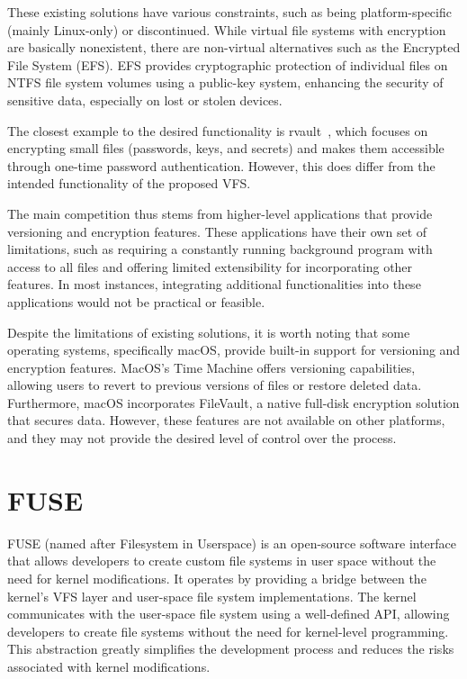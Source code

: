 These existing solutions have various constraints, such as being platform-specific (mainly Linux-only) or discontinued.
While virtual file systems with encryption are basically nonexistent, there are non-virtual alternatives such as the Encrypted File System (EFS).
EFS provides cryptographic protection of individual files on NTFS file system volumes using a public-key system, enhancing the security of sensitive data, especially on lost or stolen devices.

The closest example to the desired functionality is rvault~\cite{rvault}, which focuses on encrypting small files (passwords, keys, and secrets) and makes them accessible through one-time password authentication.
However, this does differ from the intended functionality of the proposed VFS\@.

The main competition thus stems from higher-level applications that provide versioning and encryption features.
These applications have their own set of limitations, such as requiring a constantly running background program with access to all files and offering limited extensibility for incorporating other features.
In most instances, integrating additional functionalities into these applications would not be practical or feasible.

Despite the limitations of existing solutions, it is worth noting that some operating systems, specifically macOS, provide built-in support for versioning and encryption features.
MacOS's Time Machine offers versioning capabilities, allowing users to revert to previous versions of files or restore deleted data.
Furthermore, macOS incorporates FileVault, a native full-disk encryption solution that secures data.
However, these features are not available on other platforms, and they may not provide the desired level of control over the process.

\section{FUSE}\label{sec:fuse}

FUSE (named after Filesystem in Userspace) is an open-source software interface that allows developers to create custom file systems in user space without the need for kernel modifications.
It operates by providing a bridge between the kernel's VFS layer and user-space file system implementations.
The kernel communicates with the user-space file system using a well-defined API, allowing developers to create file systems without the need for kernel-level programming.
This abstraction greatly simplifies the development process and reduces the risks associated with kernel modifications.

